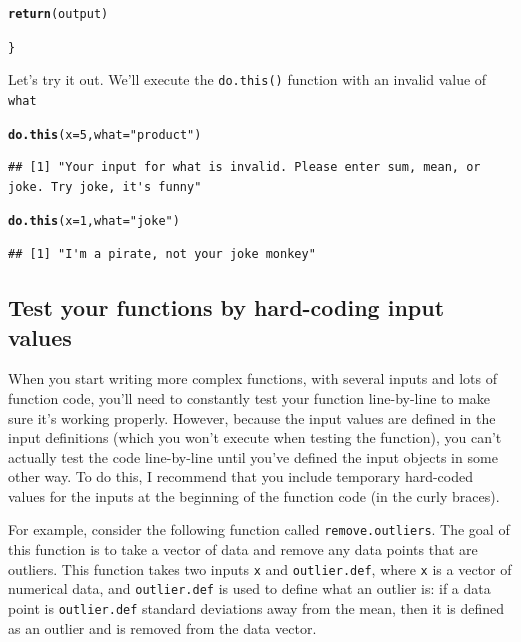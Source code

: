 \documentclass{tufte-book}\usepackage[]{graphicx}\usepackage[]{color}
\makeatletter
\newcommand{\hlnum}[1]{\textcolor[rgb]{0.686,0.059,0.569}{#1}}%
\newcommand{\hlstr}[1]{\textcolor[rgb]{0.192,0.494,0.8}{#1}}%
\newcommand{\hlstd}[1]{\textcolor[rgb]{0.345,0.345,0.345}{#1}}%
\newcommand{\hlkwc}[1]{\textcolor[rgb]{0.333,0.667,0.333}{#1}}%
\newcommand{\hlkwd}[1]{\textcolor[rgb]{0.737,0.353,0.396}{\textbf{#1}}}%
\newenvironment{kframe}{%
 \def\at@end@of@kframe{}%
 \ifinner\ifhmode%
  \def\at@end@of@kframe{\end{minipage}}%
  \begin{minipage}{\columnwidth}%
 \fi\fi%
 \def\FrameCommand##1{\hskip\@totalleftmargin \hskip-\fboxsep
 \colorbox{shadecolor}{##1}\hskip-\fboxsep
     \hskip-\linewidth \hskip-\@totalleftmargin \hskip\columnwidth}%
 \MakeFramed {\advance\hsize-\width
   \@totalleftmargin\z@ \linewidth\hsize
   \@setminipage}}%
 {\par\unskip\endMakeFramed%
 \at@end@of@kframe}
\newenvironment{knitrout}{}{} %
\makeatother
\begin{document}
\begin{footnotesize}
\begin{knitrout}
\begin{kframe}
\begin{alltt}
  \hlkwd{return}\hlstd{(output)}

\hlstd{\}}
\end{alltt}
\end{kframe}
\end{knitrout}

Let's try it out. We'll execute the \texttt{do.this()} function with an invalid value of \texttt{what}

\begin{knitrout}
\color{fgcolor}\begin{kframe}
\begin{alltt}
\hlkwd{do.this}\hlstd{(}\hlkwc{x} \hlstd{=} \hlnum{5}\hlstd{,} \hlkwc{what} \hlstd{=} \hlstr{"product"}\hlstd{)}
\end{alltt}
\begin{verbatim}
## [1] "Your input for what is invalid. Please enter sum, mean, or joke. Try joke, it's funny"
\end{verbatim}
\begin{alltt}
\hlkwd{do.this}\hlstd{(}\hlkwc{x} \hlstd{=} \hlnum{1}\hlstd{,} \hlkwc{what} \hlstd{=} \hlstr{"joke"}\hlstd{)}
\end{alltt}
\begin{verbatim}
## [1] "I'm a pirate, not your joke monkey"
\end{verbatim}
\end{kframe}
\end{knitrout}


\subsection{Test your functions by hard-coding input values}

When you start writing more complex functions, with several inputs and lots of function code, you'll need to constantly test your function line-by-line to make sure it's working properly. However, because the input values are defined in the input definitions (which you won't execute when testing the function), you can't actually test the code line-by-line until you've defined the input objects in some other way. To do this, I recommend that you include temporary hard-coded values for the inputs at the beginning of the function code (in the curly braces).

For example, consider the following function called \texttt{remove.outliers}. The goal of this function is to take a vector of data and remove any data points that are outliers. This function takes two inputs \texttt{x} and \texttt{outlier.def}, where \texttt{x} is a vector of numerical data, and \texttt{outlier.def} is used to define what an outlier is: if a data point is \texttt{outlier.def} standard deviations away from the mean, then it is defined as an outlier and is removed from the data vector.


\end{footnotesize}
\end{document}
